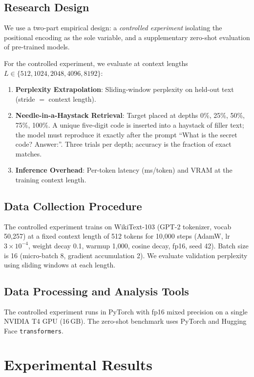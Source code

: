 \documentclass[conference]{IEEEtran}
\begin{document}
\subsection{Research Design}
We use a two-part empirical design: a \emph{controlled experiment} isolating the positional encoding as the sole variable, and a supplementary zero-shot evaluation of pre-trained models.

For the controlled experiment, we evaluate at context lengths $L \in \{512, 1024, 2048, 4096, 8192\}$:
\begin{enumerate}
\item \textbf{Perplexity Extrapolation}: Sliding-window perplexity on held-out text (stride $=$ context length).
\item \textbf{Needle-in-a-Haystack Retrieval}: Target placed at depths 0\%, 25\%, 50\%, 75\%, 100\%. A unique five-digit code is inserted into a haystack of filler text; the model must reproduce it exactly after the prompt ``What is the secret code? Answer:''. Three trials per depth; accuracy is the fraction of exact matches.
\item \textbf{Inference Overhead}: Per-token latency (ms/token) and VRAM at the training context length.
\end{enumerate}

\subsection{Data Collection Procedure}
The controlled experiment trains on WikiText-103 (GPT-2 tokenizer, vocab 50,257) at a fixed context length of 512 tokens for 10,000 steps (AdamW, lr $3{\times}10^{-4}$, weight decay 0.1, warmup 1,000, cosine decay, fp16, seed 42). Batch size is 16 (micro-batch 8, gradient accumulation 2). We evaluate validation perplexity using sliding windows at each length.

\subsection{Data Processing and Analysis Tools}
The controlled experiment runs in PyTorch with fp16 mixed precision on a single NVIDIA T4 GPU (16\,GB). The zero-shot benchmark uses PyTorch and Hugging Face \texttt{transformers}.

\section{Experimental Results}
\label{sec:results}
\end{document}
